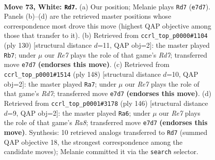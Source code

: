 \documentclass[11pt]{article}
\begin{document}
\clearpage

\begin{figure}[p]\centering
\begin{subfigure}{0.46\textwidth}\centering
\resizebox{\linewidth}{!}{%
\newchessgame
\chessboard[
  setfen={5rk1/P3R3/8/8/8/8/7K/8 w - - 15 73},
  showmover=false,
  pgfstyle=straightmove, color=movearrow, markmove={e7-d7}
]}
\caption{}
\end{subfigure}\hfill
\begin{subfigure}{0.46\textwidth}\centering
\resizebox{\linewidth}{!}{%
\newchessgame
\chessboard[
  setfen={5rk1/3R4/1p4K1/6P1/8/8/8/8 w - - 1 66},
  showmover=false,
  pgfstyle=straightmove, color=movearrow, markmove={d7-b7}
]}
\caption{}
\end{subfigure}
\\[4pt]
\begin{subfigure}{0.46\textwidth}\centering
\resizebox{\linewidth}{!}{%
\newchessgame
\chessboard[
  setfen={8/3R4/8/6pP/4kr2/8/8/3K4 w - - 16 75},
  showmover=false,
  pgfstyle=straightmove, color=movearrow, markmove={d7-a7}
]}
\caption{}
\end{subfigure}\hfill
\begin{subfigure}{0.46\textwidth}\centering
\resizebox{\linewidth}{!}{%
\newchessgame
\chessboard[
  setfen={R7/4rk2/8/5PK1/8/5P2/8/8 w - - 17 74},
  showmover=false,
  pgfstyle=straightmove, color=movearrow, markmove={a8-a6}
]}
\caption{}
\end{subfigure}
\caption{\textbf{Move 73, White: \texttt{Rd7}.} (a) Our position; Melanie plays \texttt{Rd7} (\texttt{e7d7}). Panels (b)--(d) are the retrieved master positions whose correspondence most drove this move (highest QAP objective among those that transfer to it). (b) Retrieved from \texttt{ccrl\_top\_p0000\#1104} (ply 130) [structural distance $d$=11, QAP obj=2]: the master played \texttt{Rb7}; under $\mu$ our \emph{Re7} plays the role of that game's \emph{Rd7}; transferred move \texttt{e7d7} \textbf{(endorses this move)}. (c) Retrieved from \texttt{ccrl\_top\_p0001\#1514} (ply 148) [structural distance $d$=10, QAP obj=2]: the master played \texttt{Ra7}; under $\mu$ our \emph{Re7} plays the role of that game's \emph{Rd7}; transferred move \texttt{e7d7} \textbf{(endorses this move)}. (d) Retrieved from \texttt{ccrl\_top\_p0001\#3178} (ply 146) [structural distance $d$=9, QAP obj=2]: the master played \texttt{Ra6}; under $\mu$ our \emph{Re7} plays the role of that game's \emph{Ra8}; transferred move \texttt{e7d7} \textbf{(endorses this move)}. Synthesis: 10 retrieved analogs transferred to \texttt{Rd7} (summed QAP objective 18, the strongest correspondence among the candidate moves); Melanie committed it via the \texttt{search} selector.}
\label{fig:thought-m144}
\end{figure}
\end{document}
